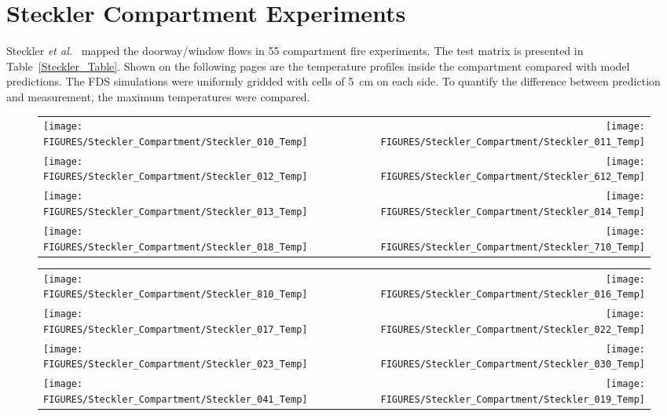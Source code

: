\clearpage

\section{Steckler Compartment Experiments}

Steckler {\em et al.}~\cite{Steckler:NBSIR_82-2520} mapped the doorway/window flows in 55 compartment fire experiments. The test matrix
is presented in Table~\ref{Steckler_Table}. Shown on
the following pages are the temperature profiles inside the compartment compared with model predictions.  The FDS
simulations were uniformly gridded with cells of 5~cm on each side. To quantify the difference between prediction and measurement, the
maximum temperatures were compared.

\newpage



\begin{figure}[p]
\begin{tabular*}{\textwidth}{l@{\extracolsep{\fill}}r}
\texttt{[image: FIGURES/Steckler\_Compartment/Steckler\_010\_Temp]} &
\texttt{[image: FIGURES/Steckler\_Compartment/Steckler\_011\_Temp]} \\
\texttt{[image: FIGURES/Steckler\_Compartment/Steckler\_012\_Temp]} &
\texttt{[image: FIGURES/Steckler\_Compartment/Steckler\_612\_Temp]} \\
\texttt{[image: FIGURES/Steckler\_Compartment/Steckler\_013\_Temp]} &
\texttt{[image: FIGURES/Steckler\_Compartment/Steckler\_014\_Temp]} \\
\texttt{[image: FIGURES/Steckler\_Compartment/Steckler\_018\_Temp]} &
\texttt{[image: FIGURES/Steckler\_Compartment/Steckler\_710\_Temp]}
\end{tabular*}
\label{Steckler_Temp_1}
\end{figure}

\begin{figure}[p]
\begin{tabular*}{\textwidth}{l@{\extracolsep{\fill}}r}
\texttt{[image: FIGURES/Steckler\_Compartment/Steckler\_810\_Temp]} &
\texttt{[image: FIGURES/Steckler\_Compartment/Steckler\_016\_Temp]} \\
\texttt{[image: FIGURES/Steckler\_Compartment/Steckler\_017\_Temp]} &
\texttt{[image: FIGURES/Steckler\_Compartment/Steckler\_022\_Temp]} \\
\texttt{[image: FIGURES/Steckler\_Compartment/Steckler\_023\_Temp]} &
\texttt{[image: FIGURES/Steckler\_Compartment/Steckler\_030\_Temp]} \\
\texttt{[image: FIGURES/Steckler\_Compartment/Steckler\_041\_Temp]} &
\texttt{[image: FIGURES/Steckler\_Compartment/Steckler\_019\_Temp]}
\end{tabular*}
\label{Steckler_Temp_2}
\end{figure}

